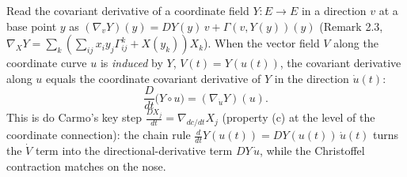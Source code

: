 \begin{lemma}
  \label{lem:dc-ch2-2-2-c-coord}
  \leanok
  Read the covariant derivative of a coordinate field $Y:E\to E$ in a direction $v$ at a base
  point $y$ as $(\nabla_v Y)(y)=DY(y)\,v+\Gamma(v,Y(y))(y)$ (Remark 2.3,
  $\nabla_X Y=\sum_k(\sum_{ij}x_iy_j\Gamma^k_{ij}+X(y_k))X_k$). When the vector field $V$ along
  the coordinate curve $u$ is \emph{induced} by $Y$, $V(t)=Y(u(t))$, the covariant derivative
  along $u$ equals the coordinate covariant derivative of $Y$ in the direction $\dot u(t)$:
  $$\frac{D}{dt}\big(Y\circ u\big)=(\nabla_{\dot u}Y)(u).$$
  This is do Carmo's key step $\frac{DX_j}{dt}=\nabla_{dc/dt}X_j$ (property (c) at the level of
  the coordinate connection): the chain rule $\frac{d}{dt}Y(u(t))=DY(u(t))\,\dot u(t)$ turns the
  $\dot V$ term into the directional-derivative term $DY\,\dot u$, while the Christoffel
  contraction matches on the nose.
\end{lemma}

